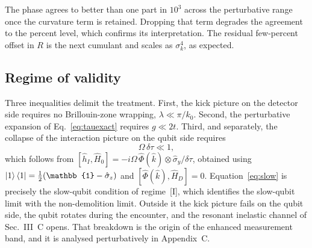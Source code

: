 \documentclass[10pt,
 amsmath,amssymb,
 aps,prb, twocolumn
]{revtex4-2}
\begin{document}
The phase agrees to better than one part in $10^{3}$ across the
perturbative range once the curvature term is retained. Dropping that term
degrades the agreement to the percent level, which confirms its
interpretation. The residual few-percent offset in $R$ is the next cumulant
and scales as $\sigma_k^{4}$, as expected.

\subsection{Regime of validity}
\label{app:vn:validity}

Three inequalities delimit the treatment. First, the kick picture on the
detector side requires no Brillouin-zone wrapping, $\lambda\ll\pi/k_0$.
Second, the perturbative expansion of Eq.~\eqref{eq:tauexact} requires
$g\ll2t$. Third, and separately, the collapse of the interaction picture on
the qubit side requires
\begin{equation}
\Omega\,\delta\tau\ll1 ,
\label{eq:slow}
\end{equation}
which follows from
$[\hat h_I,\hat H_0]=-i\Omega\,\hat\Phi(\hat k)\otimes\hat\sigma_y/\delta\tau$,
obtained using $\ket{1}\bra{1}=\tfrac12(\mathbb{1}-\hat\sigma_z)$ and
$[\hat\Phi(\hat k),\hat H_D]=0$. Equation~\eqref{eq:slow} is precisely the
slow-qubit condition of regime~[I], which identifies the slow-qubit limit
with the non-demolition limit. Outside it the kick picture fails on the
qubit side, the qubit rotates during the encounter, and the resonant
inelastic channel of Sec.~III~C opens. That breakdown is the origin of the
enhanced measurement band, and it is analysed perturbatively in
Appendix~C.
\end{document}
